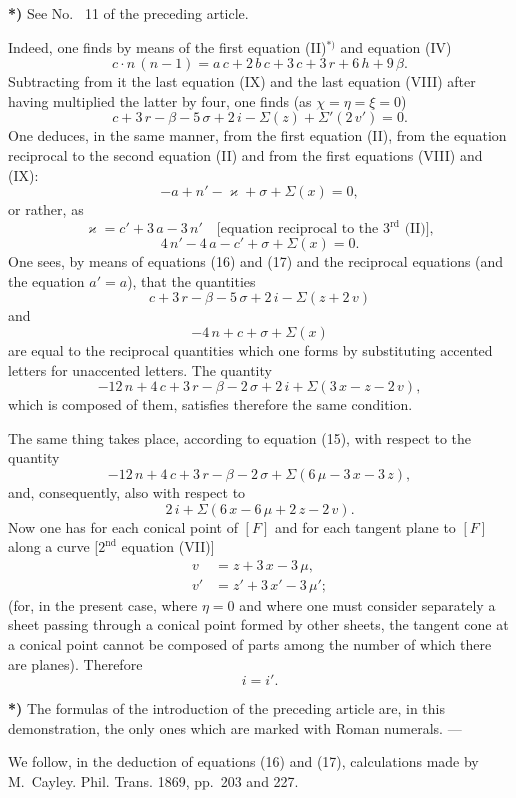 \documentclass{article}
\begin{document}
\textbf{*)} See No.~ 11 of the preceding article.

Indeed, one finds by means of the first equation (II)${}^{*)}$ and equation (IV)
\[
c \cdot n\,(n - 1) = a\,c + 2\,b\,c + 3\,c + 3\,r + 6\,h + 9\,\beta.
\]
Subtracting from it the last equation (IX) and the last equation (VIII) after having multiplied the latter by four, one finds (as $\chi = \eta = \xi = 0$)
\[
c + 3\,r - \beta - 5\,\sigma + 2\,i - \Sigma(z) + \Sigma'(2\,v') = 0. \tag{16}
\]
One deduces, in the same manner, from the first equation (II), from the equation reciprocal to the second equation (II) and from the first equations (VIII) and (IX):
\[
- a + n' - \varkappa + \sigma + \Sigma(x) = 0,
\]
or rather, as
\[
\varkappa = c' + 3\,a - 3\,n' \quad\text{[equation reciprocal to the } 3^{\text{rd}} \text{ (II)]},
\]
\[
4\,n' - 4\,a - c' + \sigma + \Sigma(x) = 0. \tag{17}
\]
One sees, by means of equations (16) and (17) and the reciprocal equations (and the equation $a' = a$), that the quantities
\[
c + 3\,r - \beta - 5\,\sigma + 2\,i - \Sigma(z + 2\,v)
\]
and
\[
- 4\,n + c + \sigma + \Sigma(x)
\]
are equal to the reciprocal quantities which one forms by substituting accented letters for unaccented letters. The quantity
\[
- 12\,n + 4\,c + 3\,r - \beta - 2\,\sigma + 2\,i + \Sigma(3\,x - z - 2\,v),
\]
which is composed of them, satisfies therefore the same condition.

The same thing takes place, according to equation (15), with respect to the quantity
\[
- 12\,n + 4\,c + 3\,r - \beta - 2\,\sigma + \Sigma(6\,\mu - 3\,x - 3\,z),
\]
and, consequently, also with respect to
\[
2\,i + \Sigma(6\,x - 6\,\mu + 2\,z - 2\,v).
\]
Now one has for each conical point of $[F]$ and for each tangent plane to $[F]$ along a curve [$2^{\text{nd}}$ equation (VII)]
\[
\begin{aligned}
v &= z + 3\,x - 3\,\mu, \\
v' &= z' + 3\,x' - 3\,\mu';
\end{aligned}
\]
(for, in the present case, where $\eta = 0$ and where one must consider separately a sheet passing through a conical point formed by other sheets, the tangent cone at a conical point cannot be composed of parts among the number of which there are planes). Therefore
\[
i = i'.
\]

\textbf{*)} The formulas of the introduction of the preceding article are, in this demonstration, the only ones which are marked with Roman numerals. ---

We follow, in the deduction of equations (16) and (17), calculations made by M.~Cayley. Phil. Trans. 1869, pp.~203 and 227.
\end{document}
